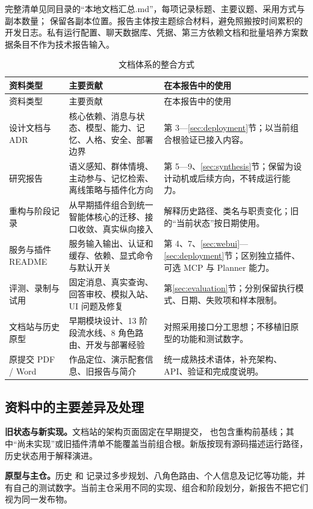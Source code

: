 完整清单见同目录的“本地文档汇总.md”，每项记录标题、主要议题、采用方式与副本数量； 保留各副本位置。报告主体按主题综合材料，避免照搬按时间累积的开发日志。私有运行配置、聊天数据库、凭据、第三方依赖文档和批量培养方案数据条目不作为技术报告输入。

\begin{longtable}{@{}L{29mm}L{62mm}L{58mm}@{}}
\caption{文档体系的整合方式}\\\toprule
资料类型 & 主要贡献 & 在本报告中的使用\\\midrule\endfirsthead
\toprule 资料类型 & 主要贡献 & 在本报告中的使用\\\midrule\endhead
设计文档与 ADR & 核心依赖、消息与状态、模型、能力、记忆、人格、安全、部署边界 & 第 3—\ref{sec:deployment}节；以当前组合根验证已接入内容。\\
研究报告 & 语义感知、群体情境、主动参与、记忆检索、离线策略与插件化方向 & 第 5—9、\ref{sec:synthesis}节；保留为设计动机或后续方向，不转成运行能力。\\
重构与阶段记录 & 从早期插件组合到统一智能体核心的迁移、接口收敛、真实纵向接入 & 解释历史路径、类名与职责变化；旧的“当前状态”按日期使用。\\
服务与插件 README & 服务输入输出、认证和缓存、依赖、显式命令与默认开关 & 第 4、7、\ref{sec:webui}—\ref{sec:deployment}节；区别独立插件、可选 MCP 与 Planner 能力。\\
评测、录制与试用 & 固定消息、真实查询、回答审校、模拟入站、UI 问题及修复 & 第\ref{sec:evaluation}节；分别保留执行模式、日期、失败项和样本限制。\\
文档站与历史原型 & 早期模块设计、13 阶段流水线、8 角色路由、开发与部署经验 & 对照采用接口分工思想；不移植旧原型的功能和测试数字。\\
原提交 PDF / Word & 作品定位、演示配套信息、旧报告与简介 & 统一成熟技术语体，补充架构、API、验证和完成度说明。\\\bottomrule
\end{longtable}

\subsection{资料中的主要差异及处理}
\textbf{旧状态与新实现。}文档站的架构页面固定在早期提交， 也包含重构前基线；其中“尚未实现”或旧插件清单不能覆盖当前组合根。新版按现有源码描述运行路径，历史状态用于解释演进。

\textbf{原型与主仓。}历史  和  记录过多步规划、八角色路由、个人信息及记忆等功能，并有自己的测试数字。当前主仓采用不同的实现、组合和阶段划分，新报告不把它们视为同一发布物。

